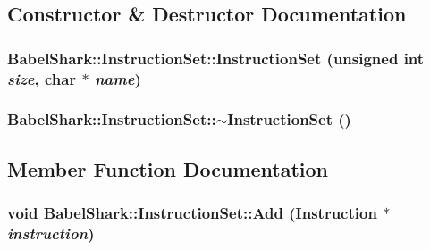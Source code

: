 \subsection{Constructor \& Destructor Documentation}
\hypertarget{class_babel_shark_1_1_instruction_set_b1d22c7566a5693c6cc44746a4a58d40}{
\subsubsection[{InstructionSet}]{\setlength{\rightskip}{0pt plus 5cm}BabelShark::InstructionSet::InstructionSet (unsigned int {\em size}, \/  char $\ast$ {\em name})}}
\label{class_babel_shark_1_1_instruction_set_b1d22c7566a5693c6cc44746a4a58d40}


\hypertarget{class_babel_shark_1_1_instruction_set_10f68c55831ae571354753c15487e8e0}{
\subsubsection[{$\sim$InstructionSet}]{\setlength{\rightskip}{0pt plus 5cm}BabelShark::InstructionSet::$\sim$InstructionSet ()}}
\label{class_babel_shark_1_1_instruction_set_10f68c55831ae571354753c15487e8e0}




\subsection{Member Function Documentation}
\hypertarget{class_babel_shark_1_1_instruction_set_0e95013b914e2f4bdda8b0f94ab87712}{
\subsubsection[{Add}]{\setlength{\rightskip}{0pt plus 5cm}void BabelShark::InstructionSet::Add ({\bf Instruction} $\ast$ {\em instruction})}}
\label{class_babel_shark_1_1_instruction_set_0e95013b914e2f4bdda8b0f94ab87712}




